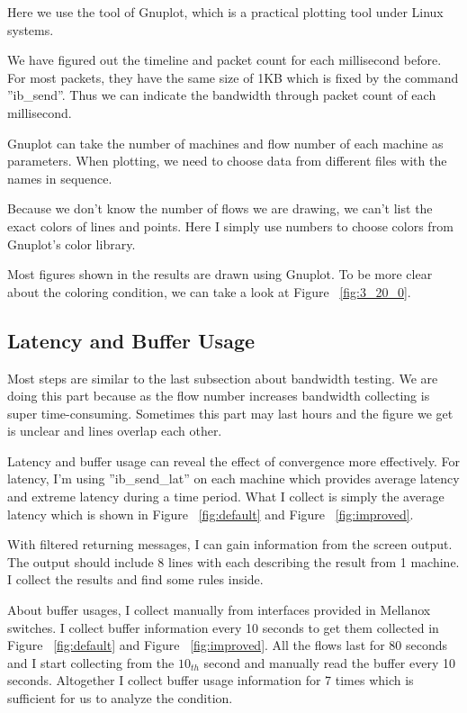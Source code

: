 \documentclass[12pt,a4paper]{article}
\begin{document}
Here we use the tool of Gnuplot, which is a practical plotting tool under Linux systems.

We have figured out the timeline and packet count for each millisecond before.
For most packets, they have the same size of 1KB which is fixed by the command ''ib\_send''.
Thus we can indicate the bandwidth through packet count of each millisecond.

Gnuplot can take the number of machines and flow number of each machine as parameters.
When plotting, we need to choose data from different files with the names in sequence.

Because we don't know the number of flows we are drawing, we can't list the exact colors of lines and points.
Here I simply use numbers to choose colors from Gnuplot's color library.

Most figures shown in the results are drawn using Gnuplot.
To be more clear about the coloring condition, we can take a look at Figure ~\ref{fig:3_20_0}.

\subsection{Latency and Buffer Usage}

Most steps are similar to the last subsection about bandwidth testing.
We are doing this part because as the flow number increases bandwidth collecting is super time-consuming.
Sometimes this part may last hours and the figure we get is unclear and lines overlap each other.

Latency and buffer usage can reveal the effect of convergence more effectively.
For latency, I'm using ''ib\_send\_lat'' on each machine which provides average latency and extreme latency during a time period.
What I collect is simply the average latency which is shown in Figure ~\ref{fig:default} and Figure ~\ref{fig:improved}.

With filtered returning messages, I can gain information from the screen output.
The output should include 8 lines with each describing the result from 1 machine.
I collect the results and find some rules inside.

About buffer usages, I collect manually from interfaces provided in Mellanox switches.
I collect buffer information every 10 seconds to get them collected in Figure ~\ref{fig:default} and Figure ~\ref{fig:improved}.
All the flows last for 80 seconds and I start collecting from the $10_{th}$ second and manually read the buffer every 10 seconds.
Altogether I collect buffer usage information for 7 times which is sufficient for us to analyze the condition.
\end{document}
